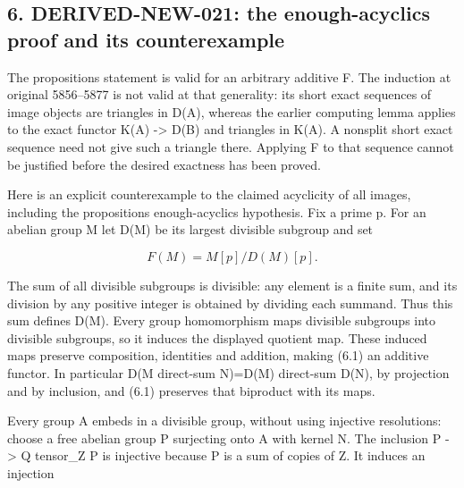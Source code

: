 \subsection{\texorpdfstring{6. DERIVED-NEW-021:\allowbreak{} the enough-acyclics proof and its counterexample}{6.  the enough-acyclics proof and its counterexample}}\label{proofs-5091-5900-derived-new-021-the-enough-acyclics-proof-and-its-counterexample}

The proposition\textquotesingle s statement is valid for an arbitrary additive F. The induction at original 5856–\allowbreak{}5877 is not valid at that generality:\allowbreak{} its short exact sequences of image objects are triangles in D(A)\allowbreak{},\allowbreak{} whereas the earlier computing lemma applies to the exact functor K(A)\allowbreak{} \allowbreak{}-> D(B)\allowbreak{} and triangles in K(A)\allowbreak{}. A nonsplit short exact sequence need not give such a triangle there. Applying F to that sequence cannot be justified before the desired exactness has been proved.

Here is an explicit counterexample to the claimed acyclicity of all images,\allowbreak{} including the proposition\textquotesingle s enough-acyclics hypothesis. Fix a prime p. For an abelian group M let D(M)\allowbreak{} be its largest divisible subgroup and set

\[
 F(M)=M[p]/D(M)[p].                                      \tag{6.1}
\]

The sum of all divisible subgroups is divisible:\allowbreak{} any element is a finite sum,\allowbreak{} and its division by any positive integer is obtained by dividing each summand. Thus this sum defines D(M)\allowbreak{}. Every group homomorphism maps divisible subgroups into divisible subgroups,\allowbreak{} so it induces the displayed quotient map. These induced maps preserve composition,\allowbreak{} identities and addition,\allowbreak{} making (6.1)\allowbreak{} an additive functor. In particular D(M direct-sum N)\allowbreak{}\allowbreak{}=D(M)\allowbreak{} direct-sum D(N)\allowbreak{},\allowbreak{} by projection and by inclusion,\allowbreak{} and (6.1)\allowbreak{} preserves that biproduct with its maps.

Every group A embeds in a divisible group,\allowbreak{} without using injective resolutions:\allowbreak{} choose a free abelian group P surjecting onto A with kernel N. The inclusion P \allowbreak{}-> Q tensor\_\allowbreak{}Z P is injective because P is a sum of copies of Z. It induces an injection

